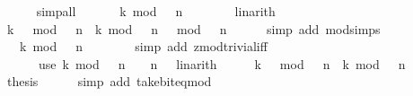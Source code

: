 \begin{isabellebody}
\ \ \ \ \isamarkupfalse%
\ simp{\isacharunderscore}{\kern0pt}all\isanewline
\ \ \isamarkupfalse%
\ \isamarkupfalse%
\ {\isacharasterisk}{\kern0pt}{\isacharcolon}{\kern0pt}\ {\isacartoucheopen}k\ mod\ {}\ {\isacharcircum}{\kern0pt}\ n\ {\isachargreater}{\kern0pt}\ {}{\isacartoucheclose}\isanewline
\ \ \ \ \isamarkupfalse%
\ linarith\isanewline
\ \ \isamarkupfalse%
\ {\isacartoucheopen}{\isacharparenleft}{\kern0pt}k\ {\isacharminus}{\kern0pt}\ {}{\isacharparenright}{\kern0pt}\ mod\ {}\ {\isacharcircum}{\kern0pt}\ n\ {\isacharequal}{\kern0pt}\ {\isacharparenleft}{\kern0pt}k\ mod\ {}\ {\isacharcircum}{\kern0pt}\ n\ {\isacharminus}{\kern0pt}\ {}{\isacharparenright}{\kern0pt}\ mod\ {}\ {\isacharcircum}{\kern0pt}\ n{\isacartoucheclose}\isanewline
\ \ \ \ \isamarkupfalse%
\ {\isacharparenleft}{\kern0pt}simp\ add{\isacharcolon}{\kern0pt}\ mod{\isacharunderscore}{\kern0pt}simps{\isacharparenright}{\kern0pt}\isanewline
\ \ \isamarkupfalse%
\ \isamarkupfalse%
\ {\isacartoucheopen}{\isasymdots}\ {\isacharequal}{\kern0pt}\ k\ mod\ {}\ {\isacharcircum}{\kern0pt}\ n\ {\isacharminus}{\kern0pt}\ {}{\isacartoucheclose}\isanewline
\ \ \ \ \isamarkupfalse%
\ {\isacharparenleft}{\kern0pt}simp\ add{\isacharcolon}{\kern0pt}\ zmod{\isacharunderscore}{\kern0pt}trivial{\isacharunderscore}{\kern0pt}iff{\isacharparenright}{\kern0pt}\isanewline
\ \ \ \ \ \ {\isacharparenleft}{\kern0pt}use\ {\isacartoucheopen}k\ mod\ {}\ {\isacharcircum}{\kern0pt}\ n\ {\isacharless}{\kern0pt}\ {}\ {\isacharcircum}{\kern0pt}\ n{\isacartoucheclose}\ {\isacharasterisk}{\kern0pt}\ \ linarith{\isacharparenright}{\kern0pt}\isanewline
\ \ \isamarkupfalse%
\ \isamarkupfalse%
\ {\isacartoucheopen}{\isacharparenleft}{\kern0pt}k\ {\isacharminus}{\kern0pt}\ {}{\isacharparenright}{\kern0pt}\ mod\ {}\ {\isacharcircum}{\kern0pt}\ n\ {\isacharequal}{\kern0pt}\ k\ mod\ {}\ {\isacharcircum}{\kern0pt}\ n\ {\isacharminus}{\kern0pt}\ {}{\isacartoucheclose}\ \isacommand{{\isachardot}{\kern0pt}}\isamarkupfalse%
\isanewline
\ \ \isamarkupfalse%
\ \isamarkupfalse%
\ {\isacharquery}{\kern0pt}thesis\isanewline
\ \ \ \ \isamarkupfalse%
\ {\isacharparenleft}{\kern0pt}simp\ add{\isacharcolon}{\kern0pt}\ take{\isacharunderscore}{\kern0pt}bit{\isacharunderscore}{\kern0pt}eq{\isacharunderscore}{\kern0pt}mod{\isacharparenright}{\kern0pt}\isanewline

\end{isabellebody}
